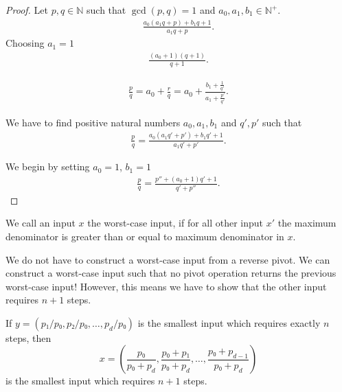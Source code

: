 \documentclass[english,version-2020-11]{uzl-thesis}
\newcommand\N{{\mathbb N}}
\begin{document}
\begin{proof}
  Let $p,q \in \N$ such that $\gcd(p, q) = 1$
  and $a_0, a_1, b_1 \in \N^+$.
  \begin{align*}
    \frac{a_0(a_1 q + p) + b_1 q + 1}{a_1 q + p}.
  \end{align*}
  Choosing $a_1 = 1$
  \begin{align*}
    \frac{(a_0 + 1) (q + 1)}{q + 1}.
  \end{align*}

  \begin{align*}
    \frac{p}{q} = a_0 + \frac{r}{q} = a_0 + \frac{b_1 + \frac{1}{q'}}{a_1 + \frac{p'}{q'}}.
  \end{align*}

  We have to find positive natural numbers $a_0, a_1, b_1$ and $q', p'$ such that
  \begin{align*}
    \frac{p}{q} = \frac{a_0(a_1 q' + p') + b_1 q' + 1}{a_1 q' + p'}.
  \end{align*}

  We begin by setting $a_0 = 1$, $b_1 = 1$
  \begin{align*}
    \frac{p}{q} = \frac{p'' + (a_0 + 1)q' + 1}{q' + p''}.
  \end{align*}
\end{proof}

We call an input $x$ the worst-case input, if for all other input $x'$
the maximum denominator is greater than or equal to maximum denominator in $x$.

We do not have to construct a worst-case input from a reverse pivot.
We can construct a worst-case input such that no pivot operation returns the
previous worst-case input!
However, this means we have to show that the other input requires $n + 1$ steps.

\begin{lemma}
  If $y = (p₁ / p₀, p₂ / p₀, \dots, p_d / p₀)$ is the smallest input which
  requires exactly $n$ steps, then
  \[
    x = \left(
      \frac{p₀}{p₀ + p_d},
      \frac{p₀ + p₁}{p₀ + p_d},
      \dots,
      \frac{p₀ + p_{d-1}}{p₀ + p_d} \right)
  \]
  is the smallest input which requires $n + 1$ steps.
\end{lemma}
\end{document}
